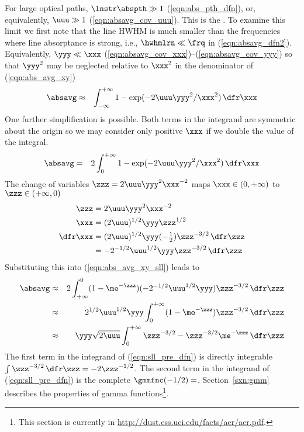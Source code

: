 \documentclass[12pt]{article}
\begin{document}
For large optical paths, $\lnstr \abspth \gg 1$
(\ref{eqn:abs_pth_dfn}), or, equivalently, $\uuu \gg 1$
(\ref{eqn:absavg_cov_uuu}).  
This is the .
To examine this limit we first note that the line HWHM is much smaller
than the frequencies where line absorptance is strong, i.e., 
$\hwhmlrn \ll \frq$ in (\ref{eqn:absavg_dfn2}). 
Equivalently, $\yyy \ll \xxx$ 
(\ref{eqn:absavg_cov_xxx})--(\ref{eqn:absavg_cov_yyy}) 
so that $\yyy^{2}$ may be neglected relative to $\xxx^{2}$ in the
denominator of (\ref{eqn:abs_avg_xy})
\begin{eqnarray}
\absavg & \approx & \int_{-\infty}^{+\infty} 
1 - \exp ( -2 \uuu \yyy^{2}/\xxx^{2} ) \nonumber
\,\dfr\xxx \nonumber
\end{eqnarray}
One further simplification is possible.
Both terms in the integrand are symmetric about the origin so we may
consider only positive $\xxx$ if we double the value of the integral. 
\begin{eqnarray}
\absavg & = & 2 \int_{0}^{+\infty} 
1 - \exp ( -2 \uuu \yyy^{2}/\xxx^{2} )
\,\dfr\xxx
\label{eqn:abs_avg_xy_sll}
\end{eqnarray}
The change of variables $\zzz = 2 \uuu \yyy^{2} \xxx^{-2}$
maps $\xxx \in (0,+\infty)$ to $\zzz \in (+\infty,0)$
\begin{subequations}
\label{eqn:sll_cov}
\begin{align}
\label{eqn:sll_cov_zzz}
\zzz & = 2 \uuu \yyy^{2} \xxx^{-2} \\
\label{eqn:sll_cov_xxx}
\xxx & = (2 \uuu)^{1/2} \yyy \zzz^{1/2} \\
\dfr\xxx & = (2 \uuu)^{1/2} \yyy 
(-{\textstyle{\frac{1}{2}}})\zzz^{-3/2} \,\dfr\zzz \nonumber \\
\label{eqn:sll_cov_dx}
& = - 2^{-1/2} \uuu^{1/2} \yyy \zzz^{-3/2} \,\dfr\zzz
\end{align}
\end{subequations} 
Substituting this into (\ref{eqn:abs_avg_xy_sll}) leads to
\begin{eqnarray}
\absavg & \approx & 
2 \int_{+\infty}^{0} 
(1 - \me^{-\zzz}) ( - 2^{-1/2} \uuu^{1/2} \yyy ) \zzz^{-3/2} 
\,\dfr\zzz \nonumber \\
& \approx & 
2^{1/2} \uuu^{1/2} \yyy \int_{0}^{+\infty}
(1 - \me^{-\zzz}) \zzz^{-3/2} 
\,\dfr\zzz \nonumber \\
& \approx & 
\yyy \sqrt{2 \uuu} \int_{0}^{+\infty}
\zzz^{-3/2} - \zzz^{-3/2} \me^{-\zzz} 
\,\dfr\zzz \nonumber
\label{eqn:sll_pre_dfn}
\end{eqnarray}
The first term in the integrand of (\ref{eqn:sll_pre_dfn}) is directly
integrable $\int \zzz^{-3/2} \,\dfr\zzz = -2 \zzz^{-1/2}$.
The second term in the integrand of (\ref{eqn:sll_pre_dfn})
is the complete  $\gmmfnc(-1/2) = $.
Section~\ref{sxn:gmm} describes the properties of gamma
functions\footnote{This section is currently in 
\url{http://dust.ess.uci.edu/facts/aer/aer.pdf}.}.
\end{document}

